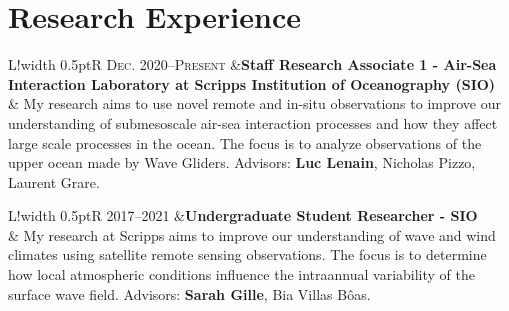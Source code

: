 \documentclass[10pt]{article}
\newcommand\VRule{\color{lightgray}\vrule width 0.5pt}
\begin{document}
\section*{Research Experience}
\vspace{.3cm}
\begin{tabular}{L!{\VRule}R}
\textsc{Dec. 2020--Present} &{\bf Staff Research Associate 1 - Air-Sea Interaction Laboratory at Scripps Institution of Oceanography (SIO)}\\
& My research aims to use novel remote and in-situ observations to improve our understanding of submesoscale air-sea interaction processes and how they affect large scale processes in the ocean. The focus is to analyze observations of the upper ocean made by Wave Gliders. Advisors: \textbf{Luc Lenain}, Nicholas Pizzo, Laurent Grare.\\[5pt]
\end{tabular}
\newline \noindent
\newline \noindent 
\newline \noindent
\begin{tabular}{L!{\VRule}R}
\textsc{2017--2021} &{\bf Undergraduate Student Researcher - SIO }\\
& My research at Scripps aims to improve our understanding of wave and wind climates using satellite remote sensing observations. The focus is to determine how local atmospheric conditions influence the intraannual variability of the surface wave field. Advisors: \textbf{Sarah Gille}, Bia Villas B\^{o}as.\\[5pt]
\end{tabular}

\vspace{.3cm}
\end{document}
